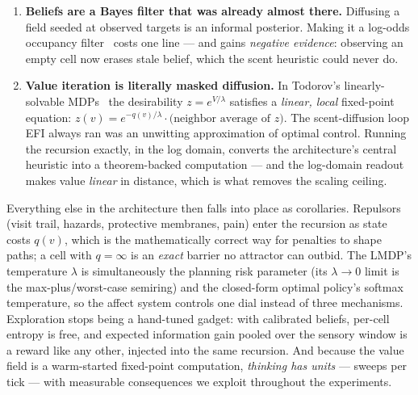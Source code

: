 \documentclass[11pt]{article}
\begin{document}
\begin{enumerate}
\item \textbf{Beliefs are a Bayes filter that was already almost there.} Diffusing a field seeded at observed targets is an informal posterior. Making it a log-odds occupancy filter~\citep{elfes1989,thrun2005} costs one line --- and gains \emph{negative evidence}: observing an empty cell now erases stale belief, which the scent heuristic could never do.
\item \textbf{Value iteration is literally masked diffusion.} In Todorov's linearly-solvable MDPs~\citep{todorov2006,todorov2009} the desirability $z = e^{V/\lambda}$ satisfies a \emph{linear, local} fixed-point equation: $z(v) = e^{-q(v)/\lambda}\cdot\text{(neighbor average of }z)$. The scent-diffusion loop EFI always ran was an unwitting approximation of optimal control. Running the recursion exactly, in the log domain, converts the architecture's central heuristic into a theorem-backed computation --- and the log-domain readout makes value \emph{linear} in distance, which is what removes the scaling ceiling.
\end{enumerate}

Everything else in the architecture then falls into place as corollaries. Repulsors (visit trail, hazards, protective membranes, pain) enter the recursion as state costs $q(v)$, which is the mathematically correct way for penalties to shape paths; a cell with $q=\infty$ is an \emph{exact} barrier no attractor can outbid. The LMDP's temperature $\lambda$ is simultaneously the planning risk parameter (its $\lambda\to 0$ limit is the max-plus/worst-case semiring) and the closed-form optimal policy's softmax temperature, so the affect system controls one dial instead of three mechanisms. Exploration stops being a hand-tuned gadget: with calibrated beliefs, per-cell entropy is free, and expected information gain pooled over the sensory window is a reward like any other, injected into the same recursion. And because the value field is a warm-started fixed-point computation, \emph{thinking has units} --- sweeps per tick --- with measurable consequences we exploit throughout the experiments.
\end{document}
